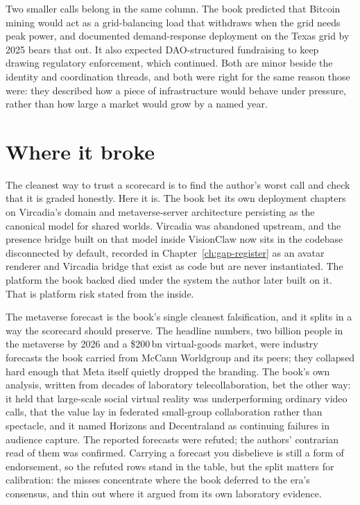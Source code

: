 Two smaller calls belong in the same column. The book predicted that Bitcoin mining would act as a grid-balancing load that withdraws when the grid needs peak power, and documented demand-response deployment on the Texas grid by 2025 bears that out. It also expected DAO-structured fundraising to keep drawing regulatory enforcement, which continued. Both are minor beside the identity and coordination threads, and both were right for the same reason those were: they described how a piece of infrastructure would behave under pressure, rather than how large a market would grow by a named year.

\section{Where it broke}

\begin{keyinsight}[title={A miss the author paid for personally}]
The cleanest way to trust a scorecard is to find the author's worst call and check that it is graded honestly. Here it is. The book bet its own deployment chapters on Vircadia's domain and metaverse-server architecture persisting as the canonical model for shared worlds. Vircadia was abandoned upstream, and the presence bridge built on that model inside VisionClaw now sits in the codebase disconnected by default, recorded in Chapter~\ref{ch:gap-register} as an avatar renderer and Vircadia bridge that exist as code but are never instantiated. The platform the book backed died under the system the author later built on it. That is platform risk stated from the inside.
\end{keyinsight}

The metaverse forecast is the book's single cleanest falsification, and it splits in a way the scorecard should preserve. The headline numbers, two billion people in the metaverse by 2026 and a \$200\,bn virtual-goods market, were industry forecasts the book carried from McCann Worldgroup and its peers; they collapsed hard enough that Meta itself quietly dropped the branding. The book's own analysis, written from decades of laboratory telecollaboration, bet the other way: it held that large-scale social virtual reality was underperforming ordinary video calls, that the value lay in federated small-group collaboration rather than spectacle, and it named Horizons and Decentraland as continuing failures in audience capture. The reported forecasts were refuted; the authors' contrarian read of them was confirmed. Carrying a forecast you disbelieve is still a form of endorsement, so the refuted rows stand in the table, but the split matters for calibration: the misses concentrate where the book deferred to the era's consensus, and thin out where it argued from its own laboratory evidence.

